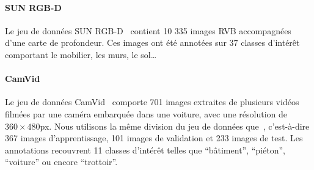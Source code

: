 \paragraph{SUN RGB-D}
Le jeu de données SUN RGB-D~\cite{song_sun_2015} contient 10 335 images RVB accompagnées d'une carte de profondeur. Ces images ont été annotées sur 37 classes d'intérêt comportant le mobilier, les murs, le sol\dots


\paragraph{CamVid}
Le jeu de données CamVid~\cite{brostow_semantic_2009} comporte 701 images extraites de plusieurs vidéos filmées par une caméra embarquée dans une voiture, avec une résolution de $360\times480$px. Nous utilisons la même division du jeu de données que~\cite{badrinarayanan_segnet:_2017}, c'est-à-dire 367 images d'apprentissage, 101 images de validation et 233 images de test. Les annotations recouvrent 11 classes d'intérêt telles que ``bâtiment'', ``piéton'', ``voiture'' ou encore ``trottoir''.

